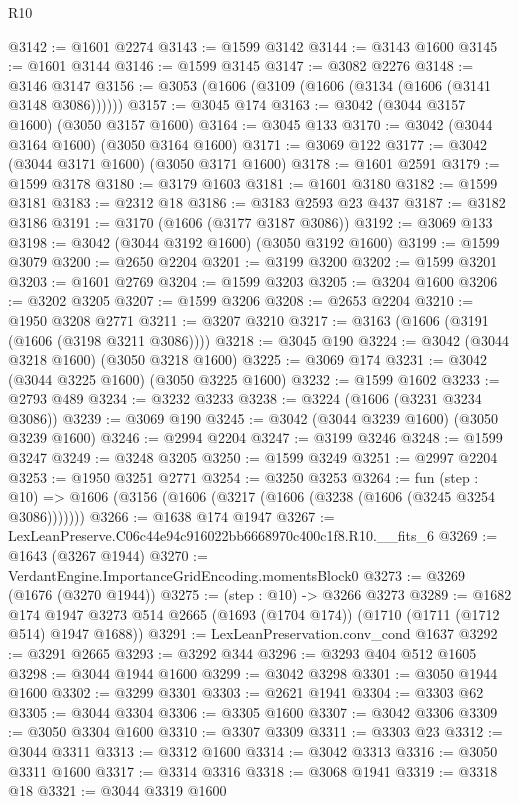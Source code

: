 \begin{lexlean}{R10}
\begin{coremodule}
@3142 := @1601 @2274
@3143 := @1599 @3142
@3144 := @3143 @1600
@3145 := @1601 @3144
@3146 := @1599 @3145
@3147 := @3082 @2276
@3148 := @3146 @3147
@3156 := @3053 (@1606 (@3109 (@1606 (@3134 (@1606 (@3141 @3148 @3086))))))
@3157 := @3045 @174
@3163 := @3042 (@3044 @3157 @1600) (@3050 @3157 @1600)
@3164 := @3045 @133
@3170 := @3042 (@3044 @3164 @1600) (@3050 @3164 @1600)
@3171 := @3069 @122
@3177 := @3042 (@3044 @3171 @1600) (@3050 @3171 @1600)
@3178 := @1601 @2591
@3179 := @1599 @3178
@3180 := @3179 @1603
@3181 := @1601 @3180
@3182 := @1599 @3181
@3183 := @2312 @18
@3186 := @3183 @2593 @23 @437
@3187 := @3182 @3186
@3191 := @3170 (@1606 (@3177 @3187 @3086))
@3192 := @3069 @133
@3198 := @3042 (@3044 @3192 @1600) (@3050 @3192 @1600)
@3199 := @1599 @3079
@3200 := @2650 @2204
@3201 := @3199 @3200
@3202 := @1599 @3201
@3203 := @1601 @2769
@3204 := @1599 @3203
@3205 := @3204 @1600
@3206 := @3202 @3205
@3207 := @1599 @3206
@3208 := @2653 @2204
@3210 := @1950 @3208 @2771
@3211 := @3207 @3210
@3217 := @3163 (@1606 (@3191 (@1606 (@3198 @3211 @3086))))
@3218 := @3045 @190
@3224 := @3042 (@3044 @3218 @1600) (@3050 @3218 @1600)
@3225 := @3069 @174
@3231 := @3042 (@3044 @3225 @1600) (@3050 @3225 @1600)
@3232 := @1599 @1602
@3233 := @2793 @489
@3234 := @3232 @3233
@3238 := @3224 (@1606 (@3231 @3234 @3086))
@3239 := @3069 @190
@3245 := @3042 (@3044 @3239 @1600) (@3050 @3239 @1600)
@3246 := @2994 @2204
@3247 := @3199 @3246
@3248 := @1599 @3247
@3249 := @3248 @3205
@3250 := @1599 @3249
@3251 := @2997 @2204
@3253 := @1950 @3251 @2771
@3254 := @3250 @3253
@3264 := fun (step : @10) =>
  @1606 (@3156 (@1606 (@3217 (@1606 (@3238 (@1606 (@3245 @3254 @3086)))))))
@3266 := @1638 @174 @1947
@3267 := LexLeanPreserve.C06c44e94c916022bb6668970c400c1f8.R10.__fits_6
@3269 := @1643 (@3267 @1944)
@3270 := VerdantEngine.ImportanceGridEncoding.momentsBlock0
@3273 := @3269 (@1676 (@3270 @1944))
@3275 := (step : @10) -> @3266 @3273
@3289 := @1682
    @174
    @1947
    @3273
    @514
    @2665
    (@1693 (@1704 @174))
    (@1710 (@1711 (@1712 @514) @1947 @1688))
@3291 := LexLeanPreservation.conv_cond @1637
@3292 := @3291 @2665
@3293 := @3292 @344
@3296 := @3293 @404 @512 @1605
@3298 := @3044 @1944 @1600
@3299 := @3042 @3298
@3301 := @3050 @1944 @1600
@3302 := @3299 @3301
@3303 := @2621 @1941
@3304 := @3303 @62
@3305 := @3044 @3304
@3306 := @3305 @1600
@3307 := @3042 @3306
@3309 := @3050 @3304 @1600
@3310 := @3307 @3309
@3311 := @3303 @23
@3312 := @3044 @3311
@3313 := @3312 @1600
@3314 := @3042 @3313
@3316 := @3050 @3311 @1600
@3317 := @3314 @3316
@3318 := @3068 @1941
@3319 := @3318 @18
@3321 := @3044 @3319 @1600

\end{coremodule}
\end{lexlean}
